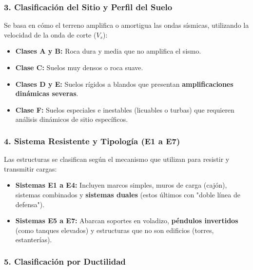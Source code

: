 \documentclass[14pt,letterpaper]{extarticle}
\begin{document}
	
	



	


 
	
	\subsubsection{3. Clasificación del Sitio y Perfil del Suelo}
	
	Se basa en cómo el terreno amplifica o amortigua las ondas sísmicas, utilizando la velocidad de la onda de corte ($V_s$):
	
	\begin{itemize}
		\item \textbf{Clases A y B:} Roca dura y media que no amplifica el sismo.
		
		\item \textbf{Clase C:} Suelos muy densos o roca suave.
		
		\item \textbf{Clases D y E:} Suelos rígidos a blandos que presentan \textbf{amplificaciones dinámicas severas}.
		
		\item \textbf{Clase F:} Suelos especiales e inestables (licuables o turbas) que requieren análisis dinámicos de sitio específicos.
	\end{itemize}
	
	\subsubsection{4. Sistema Resistente y Tipología (E1 a E7)}
	
	Las estructuras se clasifican según el mecanismo que utilizan para resistir y transmitir cargas:
	
	\begin{itemize}
		\item \textbf{Sistemas E1 a E4:} Incluyen marcos simples, muros de carga (cajón), sistemas combinados y \textbf{sistemas duales} (estos últimos con "doble línea de defensa").
		
		\item \textbf{Sistemas E5 a E7:} Abarcan soportes en voladizo, \textbf{péndulos invertidos} (como tanques elevados) y estructuras que no son edificios (torres, estanterías).
	\end{itemize}
	
	\subsubsection{5. Clasificación por Ductilidad}
	
\end{document}
